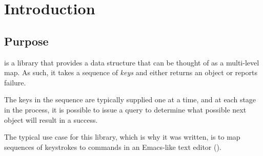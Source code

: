 \chapter{Introduction}
%

\section{Purpose}

\sysname{} is a library that provides a data structure that can be
thought of as a multi-level map.  As such, it takes a sequence of
\emph{keys} and either returns an object or reports failure.

The keys in the sequence are typically supplied one at a time, and at
each stage in the process, it is possible to issue a query to
determine what possible next object will result in a success.

The typical use case for this library, which is why it was written, is
to map sequences of keystrokes to commands in an Emacs-like text
editor
(\cite{GNUEmacsLispReferenceManual,CraftOfTextEditiing,Finseth:1980:TPTa}).
